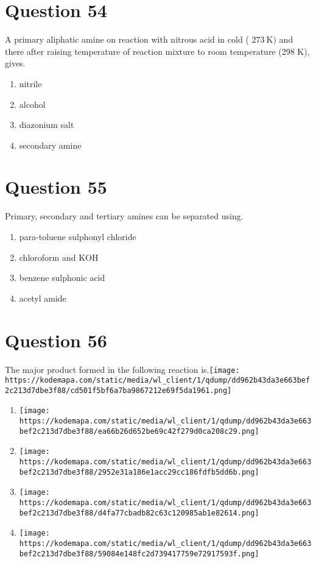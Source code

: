 \documentclass{article}
\begin{document}
\section*{Question 54}
A primary aliphatic amine on reaction with nitrous acid in cold ( \(273 \mathrm{~K})\) and there after raising temperature of reaction mixture to room temperature (298 K), gives.
\begin{enumerate}[label=(\alph*)]
\item nitrile
\item alcohol
\item diazonium salt
\item secondary amine
\end{enumerate}
\newpage
\section*{Question 55}
Primary, secondary and tertiary amines can be separated using. 
\begin{enumerate}[label=(\alph*)]
\item para-toluene sulphonyl chloride
\item chloroform and \(\mathrm{KOH}\)
\item benzene sulphonic acid
\item acetyl amide
\end{enumerate}
\newpage
\section*{Question 56}
The major product formed in the following reaction is.\texttt{[image: https://kodemapa.com/static/media/wl\_client/1/qdump/dd962b43da3e663bef2c213d7dbe3f88/cd501f5bf6a7ba9867212e69f5da1961.png]}\newline
\begin{enumerate}[label=(\alph*)]
\item \texttt{[image: https://kodemapa.com/static/media/wl\_client/1/qdump/dd962b43da3e663bef2c213d7dbe3f88/ea66b26d652be69c42f279d0ca208c29.png]}
\item \texttt{[image: https://kodemapa.com/static/media/wl\_client/1/qdump/dd962b43da3e663bef2c213d7dbe3f88/2952e31a186e1acc29cc186fdfb5dd6b.png]}
\item \texttt{[image: https://kodemapa.com/static/media/wl\_client/1/qdump/dd962b43da3e663bef2c213d7dbe3f88/d4fa77cbadb82c63c120985ab1e82614.png]}
\item \texttt{[image: https://kodemapa.com/static/media/wl\_client/1/qdump/dd962b43da3e663bef2c213d7dbe3f88/59084e148fc2d739417759e72917593f.png]}
\end{enumerate}
\newpage
\end{document}
